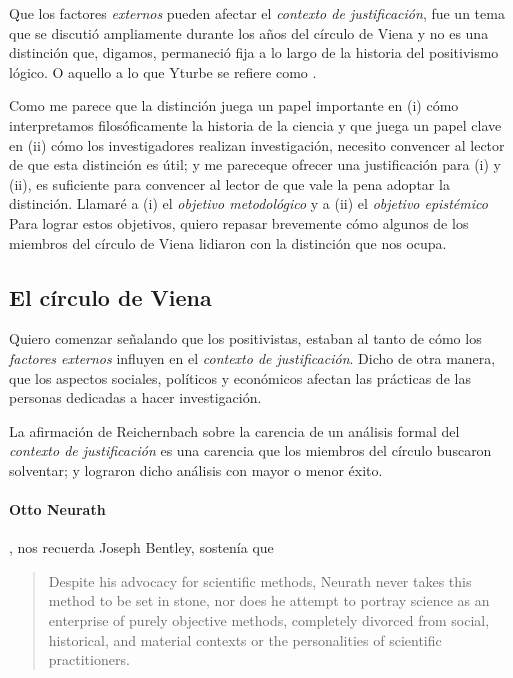Que los factores \emph{externos} pueden afectar el \emph{contexto de justificación}, fue un tema que se discutió ampliamente durante los años del círculo de Viena y no es una distinción que, digamos, permaneció fija a lo largo de la historia del positivismo lógico. 
O aquello a lo que Yturbe se refiere como .

Como me parece que la distinción juega un papel importante en (i) cómo interpretamos filosóficamente la historia de la ciencia y que juega un papel clave en (ii) cómo los investigadores realizan investigación, necesito convencer al lector de que esta distinción es útil; 
y me pareceque ofrecer una justificación para (i) y (ii), es suficiente para convencer al lector de que vale la pena adoptar la distinción.
Llamaré a (i) el \emph{objetivo metodológico} y a (ii) el \emph{objetivo epistémico}
Para lograr estos objetivos, quiero repasar brevemente cómo algunos de los miembros del círculo de Viena lidiaron con la distinción que nos ocupa.


\subsection{El círculo de Viena}

\noindent Quiero comenzar señalando que los positivistas, 
estaban al tanto de cómo los \emph{factores externos} influyen en el \emph{contexto de justificación}.
Dicho de otra manera, que los aspectos sociales, políticos y económicos afectan las prácticas de las personas dedicadas a hacer investigación.

La afirmación de Reichernbach sobre la carencia de un análisis formal del \emph{contexto de justificación} es una carencia que los miembros del círculo buscaron solventar; y lograron dicho análisis con mayor o menor éxito.

\paragraph{Otto Neurath}, nos recuerda Joseph Bentley, sostenía que

\begin{quote}
	Despite his advocacy for scientific methods, Neurath never takes this method to be set in stone, nor does he attempt to portray science as an enterprise of purely objective methods, completely divorced from social, historical, and material contexts or the personalities of scientific practitioners. \parencite[p.~41]{Bentley2023}
\end{quote}

